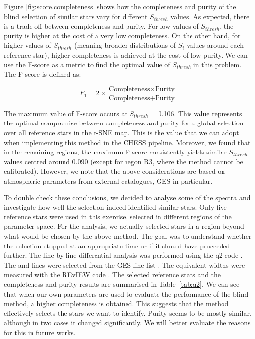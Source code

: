 \documentclass{aa}
\begin{document}
Figure \ref{fig:score.completeness} shows how the completeness and purity of the blind selection of similar stars vary for different $S_{thresh}$ values. As expected, there is a trade-off between completeness and purity. For low values of $S_{thresh}$, the purity is higher at the cost of a very low completeness. On the other hand, for higher values of $S_{thresh}$ (meaning broader distributions of $S_i$ values around each reference star), higher completeness is achieved at the cost of low purity. We can use the F-score as a metric to find the optimal value of $S_{thresh}$ in this problem. The F-score is defined as:

\begin{equation}
    F_1 = 2 \times \frac{\text{Completeness} \times \text{Purity}}{\text{Completeness} + \text{Purity}}
    \label{eq:f1_score}
\end{equation}

The maximum value of F-score occurs at $S_{thresh}$ = 0.106. This value represents the optimal compromise between completeness and purity for a global selection over all reference stars in the t-SNE map. This is the value that we can adopt when implementing this method in the {\sf CHESS} pipeline. Moreover, we found that in the remaining regions, the maximum F-score consistently yields similar $S_{thresh}$ values centred around 0.090 (except for regon R3, where the method cannot be calibrated). However, we note that the above considerations are based on atmospheric parameters from external catalogues, GES in particular.

To double check these conclusions, we decided to analyse some of the spectra and investigate how well the selection indeed identified similar stars. Only five reference stars were used in this exercise, selected in different regions of the parameter space. For the analysis, we actually selected stars in a region beyond what would be chosen by the above method. The goal was to understand whether the selection stopped at an appropriate time or if it should have proceeded further. The line-by-line differential analysis was performed using the q2 code \citep{Ramirez2014}. The  and  lines were selected from the GES line list \citep{Heiter2021}. The equivalent widths were measured with the REvIEW code \citep{McKenzie22}. The selected reference stars and the completeness and purity results are summarised in Table~\ref{tab:q2}. We can see that when our own parameters are used to evaluate the performance of the blind method, a higher completeness is obtained. This suggests that the method effectively selects the stars we want to identify. Purity seems to be mostly similar, although in two cases it changed significantly. We will better evaluate the reasons for this in future works. 
\end{document}
